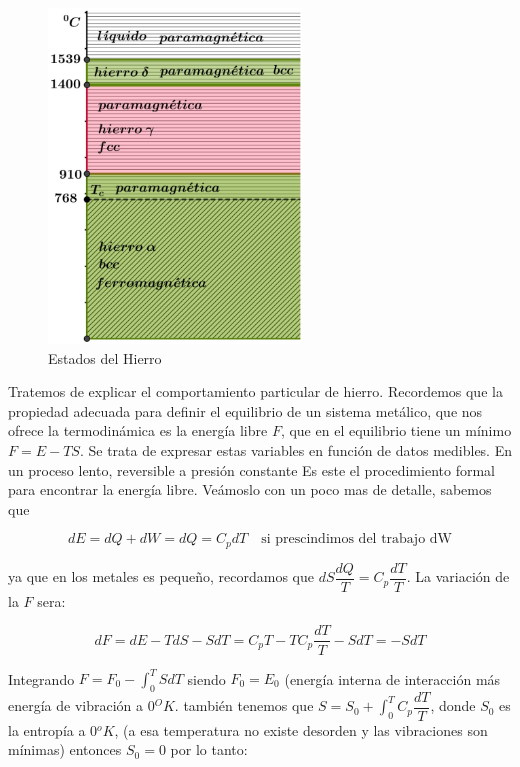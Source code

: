 \begin{figure}[H]
    \centering
    \includegraphics[width=0.6\textwidth]{./Figures/fig_d1}
	\caption{Estados del Hierro}
	\label{fig:d1}
\end{figure}

Tratemos de explicar el comportamiento particular de hierro. Recordemos que la propiedad adecuada para definir el equilibrio de un sistema metálico, que nos ofrece la termodinámica es la energía libre $F$, que en el equilibrio tiene un mínimo $F=E-TS$. Se trata de expresar estas variables en función de datos medibles. En un proceso lento, reversible a presión constante Es este el procedimiento formal para encontrar la energía libre. Veámoslo con un poco mas de detalle, sabemos que

\begin{equation}
	dE=dQ+dW=dQ=C_{p}dT \quad\text{si prescindimos del trabajo dW}
\end{equation}

ya que en los metales es pequeño, recordamos que $dS\dfrac{dQ}{T}=C_{p}\dfrac{dT}{T}$. La variación de la $F$ sera:

\begin{equation}
	dF=dE-TdS-SdT=C_{p}T-TC_{p}\dfrac{dT}{T}-SdT=-SdT
\end{equation}


Integrando $F=F_{0}-\int_{0}^{T}SdT$ siendo $F_{0}=E_{0}$ (energía interna de interacción más energía de vibración a $0{^{O}K}$. también tenemos que $S=S_{0}+\int_{0}^{T}C_{p}\dfrac{dT}{T}$, donde $S_{0}$ es la entropía a $0{^{o}K}$, (a esa temperatura no existe desorden y las vibraciones son mínimas) entonces $S_{0}=0$ por lo tanto:

